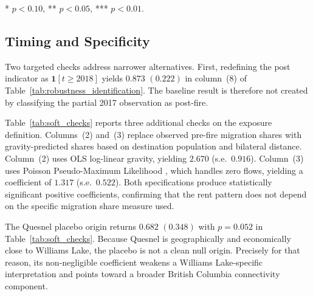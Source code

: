 \documentclass[12pt]{article}
\begin{document}
\begin{landscape}
\begin{table}[htbp]
{\begin{threeparttable}
\begin{tablenotes}[flushleft]
      * $p < 0.10$, ** $p < 0.05$, *** $p < 0.01$.
   \end{tablenotes}
   \end{threeparttable}}
\end{table}
\end{landscape}

\subsection{Timing and Specificity}
\label{sec:t2018_specificity}

Two targeted checks address narrower alternatives. First,
redefining the post indicator as $\mathbf{1}[t\geq 2018]$ yields
$0.873$ $(0.222)$ in column~(8) of
Table~\ref{tab:robustness_identification}. The baseline result is therefore not
created by classifying the partial 2017 observation as post-fire.

Table~\ref{tab:soft_checks} reports three additional checks on the exposure
definition. Columns~(2) and~(3) replace observed pre-fire migration shares
with gravity-predicted shares based on destination population and bilateral
distance. Column~(2) uses OLS log-linear gravity, yielding $2.670$
(s.e.\ $0.916$). Column~(3) uses Poisson Pseudo-Maximum Likelihood
\citep{santossilva2006}, which handles zero flows, yielding a coefficient of
$1.317$ (s.e.\ $0.522$). Both specifications produce statistically significant positive
coefficients, confirming that the rent pattern does not depend on the specific
migration share measure used.

The Quesnel placebo origin returns $0.682$ $(0.348)$ with
$p=0.052$ in Table~\ref{tab:soft_checks}. Because Quesnel is geographically
and economically close to Williams Lake, the placebo is not a clean null origin.
Precisely for that reason, its non-negligible coefficient weakens a
Williams Lake-specific interpretation and points toward a broader British
Columbia connectivity component.
\end{document}
